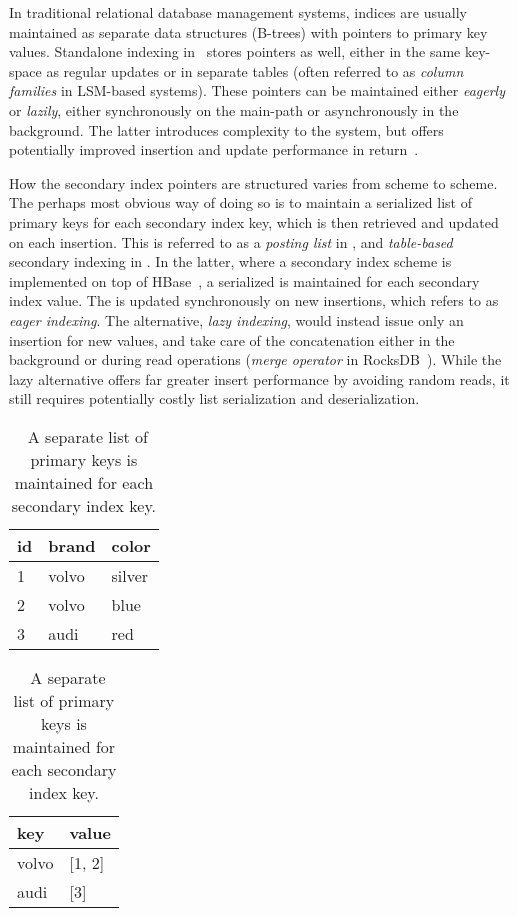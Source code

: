 In traditional relational database management systems, indices are usually
maintained as separate data structures (\eg B-trees) with pointers to primary
key values. Standalone indexing in~\cite{lsm-comparison} stores pointers as
well, either in the same key-space as regular updates or in separate tables
(often referred to as \textit{column families} in LSM-based systems). These
pointers can be maintained either \textit{eagerly} or \textit{lazily}, \eg
either synchronously on the main-path or asynchronously in the background. The
latter introduces complexity to the system, but offers potentially improved
insertion and update performance in return~\cite{deli, pnuts}.

How the secondary index pointers are structured varies from scheme to scheme.
The perhaps most obvious way of doing so is to maintain a serialized list of
primary keys for each secondary index key, which is then retrieved and updated
on each insertion. This is referred to as a \textit{posting list} in
\cite{lsm-comparison}, and \textit{table-based} secondary indexing in
\cite{hbase-secondary}. In the latter, where a secondary index scheme is
implemented on top of HBase~\cite{hbase}, a serialized  is
maintained for each secondary index value. The  is updated
synchronously on new insertions, which \cite{lsm-comparison} refers to as
\textit{eager indexing}. The alternative, \textit{lazy indexing}, would instead
issue only an insertion for new values, and take care of the concatenation
either in the background or during read operations (\textit{merge operator} in
RocksDB~\cite{rocksdb-merge}). While the lazy alternative offers far greater
insert performance by avoiding random reads, it still requires potentially
costly list serialization and deserialization.

\begin{table}[H]
  \centering
  \begin{tabular}{l l l}
    \toprule
    \textbf{id} & \textbf{brand} & \textbf{color} \\ \midrule
    1 & volvo & silver \\ \midrule
    2 & volvo & blue \\ \midrule
    3 & audi & red \\ \bottomrule
  \end{tabular}
  \quad
  \begin{tabular}{l l}
    \toprule
    \textbf{key} & \textbf{value} \\ \midrule
    volvo & [1, 2] \\ \midrule
    audi & [3] \\ \bottomrule
  \end{tabular}

  \caption{\
    A separate list of primary keys is maintained for each secondary index key.
  }\label{table:secondary-list}
\end{table}

